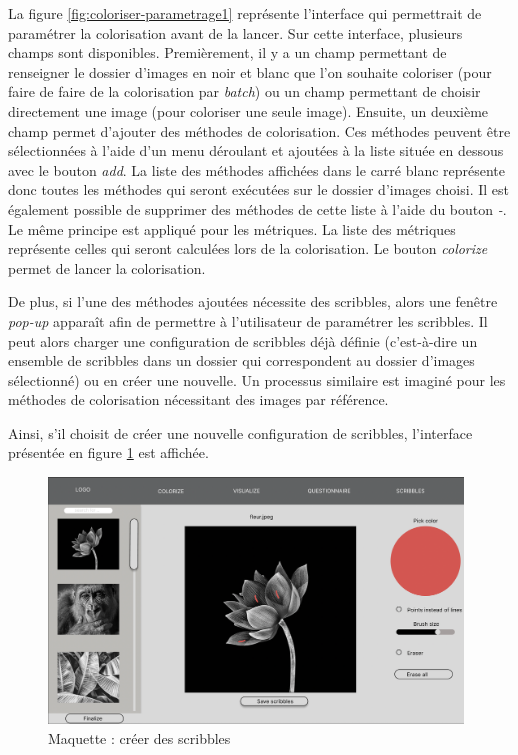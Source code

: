 \documentclass{article}
\begin{document}
La figure \ref{fig:coloriser-parametrage1} représente l'interface qui permettrait de paramétrer la colorisation avant de la lancer.
Sur cette interface, plusieurs champs sont disponibles. Premièrement, il y a un champ permettant de renseigner le dossier d'images en noir et blanc
que l'on souhaite coloriser (pour faire de faire de la colorisation par \textit{batch}) ou un champ permettant de choisir directement une image (pour coloriser une seule image). Ensuite, un deuxième champ permet d'ajouter des méthodes de colorisation. Ces méthodes peuvent être sélectionnées
à l'aide d'un menu déroulant et ajoutées à la liste située en dessous avec le bouton \textit{add}.
La liste des méthodes affichées dans le carré blanc représente donc toutes les méthodes qui seront exécutées sur le dossier d'images choisi.
Il est également possible de supprimer des méthodes de cette liste à l'aide du bouton \textit{-}.
Le même principe est appliqué pour les métriques. La liste des métriques représente celles qui seront calculées lors de la colorisation.
Le bouton \textit{colorize} permet de lancer la colorisation.

De plus, si l'une des méthodes ajoutées nécessite des scribbles, alors une fenêtre \textit{pop-up} apparaît
afin de permettre à l'utilisateur de paramétrer les scribbles. Il peut alors charger une configuration de scribbles déjà définie (c'est-à-dire
un ensemble de scribbles dans un dossier qui correspondent au dossier d'images sélectionné) ou en créer une nouvelle.
Un processus similaire est imaginé pour les méthodes de colorisation nécessitant des images par référence.

Ainsi, s'il choisit de créer une nouvelle configuration de scribbles, l'interface présentée en figure \ref{fig:coloriser-scribbles} est affichée.

\begin{figure}[!ht]
    \centering
    \includegraphics[width=11cm]{coloriser-scribbles.png}
    \caption{Maquette : créer des scribbles}
    \label{fig:coloriser-scribbles}
\end{figure}
\end{document}
